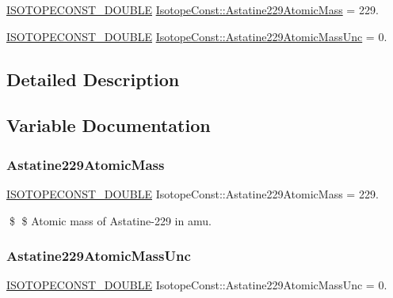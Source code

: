 \begin{DoxyCompactItemize}
\item 
\mbox{\hyperlink{group___isotope_const-_macros_ga8f45a7272ce02c0b4c65c44636ed719a}{I\+S\+O\+T\+O\+P\+E\+C\+O\+N\+S\+T\+\_\+\+D\+O\+U\+B\+LE}} \mbox{\hyperlink{group___isotope_const-_astatine-_at229_ga666e4b7d74fe953fcf94b7ee7c4cd9fd}{Isotope\+Const\+::\+Astatine229\+Atomic\+Mass}} = 229.
\item 
\mbox{\hyperlink{group___isotope_const-_macros_ga8f45a7272ce02c0b4c65c44636ed719a}{I\+S\+O\+T\+O\+P\+E\+C\+O\+N\+S\+T\+\_\+\+D\+O\+U\+B\+LE}} \mbox{\hyperlink{group___isotope_const-_astatine-_at229_ga205bc355f265699322785fdbe2a77935}{Isotope\+Const\+::\+Astatine229\+Atomic\+Mass\+Unc}} = 0.
\end{DoxyCompactItemize}


\subsection{Detailed Description}


\subsection{Variable Documentation}
\mbox{\label{group___isotope_const-_astatine-_at229_ga666e4b7d74fe953fcf94b7ee7c4cd9fd}} 
\subsubsection{\texorpdfstring{Astatine229\+Atomic\+Mass}{Astatine229AtomicMass}}
{\footnotesize\ttfamily \mbox{\hyperlink{group___isotope_const-_macros_ga8f45a7272ce02c0b4c65c44636ed719a}{I\+S\+O\+T\+O\+P\+E\+C\+O\+N\+S\+T\+\_\+\+D\+O\+U\+B\+LE}} Isotope\+Const\+::\+Astatine229\+Atomic\+Mass = 229.}

\$ \$ Atomic mass of Astatine-\/229 in amu. \mbox{\label{group___isotope_const-_astatine-_at229_ga205bc355f265699322785fdbe2a77935}} 
\subsubsection{\texorpdfstring{Astatine229\+Atomic\+Mass\+Unc}{Astatine229AtomicMassUnc}}
{\footnotesize\ttfamily \mbox{\hyperlink{group___isotope_const-_macros_ga8f45a7272ce02c0b4c65c44636ed719a}{I\+S\+O\+T\+O\+P\+E\+C\+O\+N\+S\+T\+\_\+\+D\+O\+U\+B\+LE}} Isotope\+Const\+::\+Astatine229\+Atomic\+Mass\+Unc = 0.}

